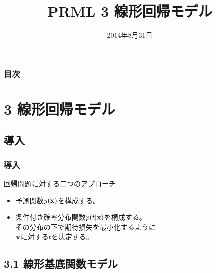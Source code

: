 \documentclass[12pt]{beamer}
\title{PRML 3 線形回帰モデル}
\institute{大阪PRML読書会}
\date{2014年8月31日}
\begin{document}
\renewcommand{\l}{\left}
\renewcommand{\r}{\right}
\newcommand{\f}{\frac}
\newcommand{\p}[2]{\frac{\partial #1}{\partial #2}}

\newcommand{\TT}{{\rm T}}
\newcommand{\ML}{{\rm ML}}
\newcommand{\e}{{\rm \bf e}}
\renewcommand{\t}{{\rm \bf t}}
\renewcommand{\v}{{\rm \bf v}}
\newcommand{\w}{{\rm \bf w}}
\renewcommand{\x}{{\rm \bf x}}
\newcommand{\y}{{\rm \bf y}}
\newcommand{\bphi}{\boldsymbol \phi}
\newcommand{\bvphi}{\boldsymbol \varphi}
\newcommand{\bPhi}{{\rm \bf \Phi}}
\newcommand{\E}{{\mathbb{E}}}
\newcommand{\N}{{\cal N}}
\newcommand{\A}{{\rm \bf A}}
\newcommand{\I}{{\rm \bf I}}
\newcommand{\T}{{\rm \bf T}}
\newcommand{\W}{{\rm \bf W}}
\newcommand{\X}{{\rm \bf X}}
\renewcommand{\tt}{{\bf \mathsf{t}}}
\newcommand{\yy}{{\bf \mathsf{y}}}
\renewcommand{\S}{\mathcal{S}}

\maketitle

\begin{frame}
  \frametitle{目次}
  \setcounter{tocdepth}{3}
  \tableofcontents
\end{frame}

\section{3 線形回帰モデル}

\subsection{導入}

\begin{frame}
  \frametitle{導入}
  回帰問題に対する二つのアプローチ
  \begin{itemize}
  \item
    予測関数\(y(\x)\)を構成する。
  \item
    条件付き確率分布関数\(p(t|\x)\)を構成する。\\
    その分布の下で期待損失を最小化するように \\
    \(\x\)に対する\(t\)を決定する。
  \end{itemize}
\end{frame}

\subsection{3.1 線形基底関数モデル}
\end{document}
